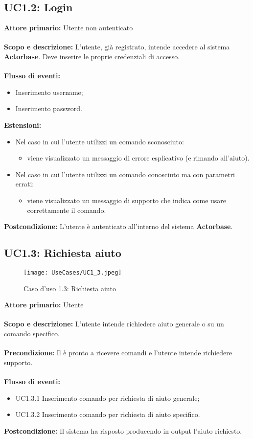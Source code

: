 \documentclass{scalatekids-article}
\begin{document}
\subsection{UC1.2: Login}
\textbf{Attore primario:} Utente non autenticato\\ \\
\textbf{Scopo e descrizione:} L’utente, già registrato, intende accedere al sistema \textbf{Actorbase}. Deve inserire le proprie credenziali di accesso. \\ \\
\textbf{Flusso di eventi:}
\begin{itemize}
\item Inserimento username;
\item Inserimento password.
\end{itemize}
\textbf{Estensioni:}
\begin{itemize}
\item Nel caso in cui l'utente utilizzi un comando sconosciuto:
  \begin{itemize}
  \item viene visualizzato un messaggio di errore esplicativo (e rimando all'aiuto).
  \end{itemize}
\item Nel caso in cui l'utente utilizzi un comando conosciuto ma con parametri errati:
  \begin{itemize}
  \item viene visualizzato un messaggio di supporto che indica come usare correttamente il comando.
  \end{itemize}
\end{itemize}
\textbf{Postcondizione:} L'utente è autenticato all'interno del sistema \textbf{Actorbase}.
\subsection{UC1.3: Richiesta aiuto}
\begin{figure}[H]
  \begin{center}
    \texttt{[image: UseCases/UC1\_3.jpeg]}
    \caption{Caso d'uso 1.3: Richiesta aiuto}
  \end{center}
\end{figure}
\textbf{Attore primario:} Utente\\ \\
\textbf{Scopo e descrizione:} L'utente intende richiedere aiuto generale o su un comando specifico.\\ \\
\textbf{Precondizione:} Il  è pronto a ricevere comandi e l'utente intende richiedere supporto.\\ \\
\textbf{Flusso di eventi:}
\begin{itemize}
\item UC1.3.1 Inserimento comando per richiesta di aiuto generale;
\item UC1.3.2 Inserimento comando per richiesta di aiuto specifico.
\end{itemize}
\textbf{Postcondizione:} Il sistema ha risposto producendo in output l'aiuto richiesto.
\end{document}

